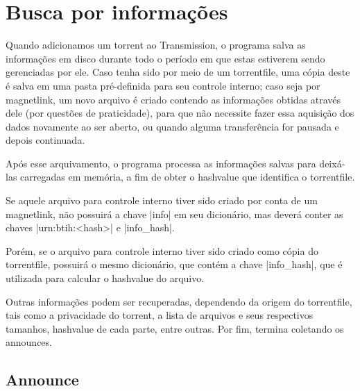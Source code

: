 \section{Busca por informações}

Quando adicionamos um \gls*{torrent} ao Transmission, o programa salva as
informações em disco durante todo o período em que estas estiverem sendo gerenciadas
por ele. Caso tenha sido por meio de um \gls*{torrentfile}, uma cópia deste é salva em
uma pasta pré-definida para seu controle interno; caso seja por \gls*{magnetlink}, um
novo arquivo é criado contendo as informações obtidas através dele (por questões de
praticidade), para que não necessite fazer essa aquisição dos dados novamente ao ser
aberto, ou quando alguma transferência for pausada e depois continuada.

Após esse arquivamento, o programa processa as informações salvas para deixá-las
carregadas em memória, a fim de obter o \gls*{hashvalue} que identifica o
\gls*{torrentfile}.


Se aquele arquivo para controle interno tiver sido criado por conta de um
\gls*{magnetlink}, não possuirá a chave \bverb|info| em seu dicionário, mas deverá
conter as chaves \bverb|urn:btih:<hash>| e \bverb|info_hash|.


Porém, se o arquivo para controle interno tiver sido criado como cópia do
\gls*{torrentfile}, possuirá o mesmo dicionário, que contém a chave \bverb|info_hash|,
que é utilizada para calcular o \gls*{hashvalue} do arquivo.


Outras informações podem ser recuperadas, dependendo da origem do \gls*{torrentfile},
tais como a privacidade do \gls*{torrent}, a lista de arquivos e seus respectivos
tamanhos, \gls*{hashvalue} de cada parte, entre outras. Por fim, termina coletando os
\glspl{announce}.


\subsection*{Announce}


